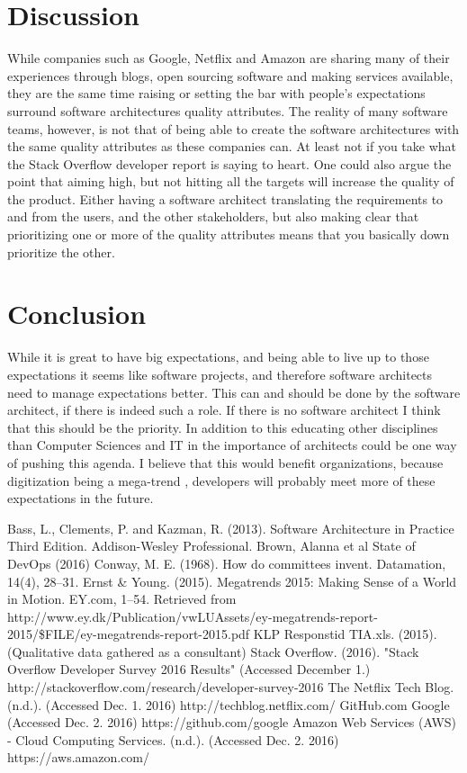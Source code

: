 \documentclass[a4paper, 10pt, conference]{ieeeconf}      %
\begin{document}
\section{Discussion}
While companies such as Google, Netflix and Amazon are sharing many of their experiences through blogs\cite{netflix}, open sourcing software\cite{github-google} and making services available\cite{amazon}, they are the same time raising or setting the bar with people’s expectations surround software architectures quality attributes.
The reality of many software teams, however, is not that of being able to create the software architectures with the same quality attributes as these companies can. At least not if you take what the Stack Overflow developer report \cite{c6} is saying to heart.
One could also argue the point that aiming high, but not hitting all the targets will increase the quality of the product.
Either having a software architect translating the requirements to and from the users, and the other stakeholders, but also making clear that prioritizing one or more of the quality attributes \cite{c1} means that you basically down prioritize the other. 

\section{Conclusion}
While it is great to have big expectations, and being able to live up to those expectations it seems like software projects, and therefore software architects need to manage expectations better. This can and should be done by the software architect, if there is indeed such a role. If there is no software architect I think that this should be the priority. 
In addition to this educating other disciplines than Computer Sciences and IT in the importance of architects could be one way of pushing this agenda.
I believe that this would benefit organizations, because digitization being a mega-trend \cite{c4}, developers will probably meet more of these expectations in the future.
\begin{thebibliography}{99}

 Bass, L., Clements, P. and Kazman, R. (2013). Software Architecture in Practice Third Edition. Addison-Wesley Professional.
Brown, Alanna et al State of DevOps (2016)
Conway, M. E. (1968). How do committees invent. Datamation, 14(4), 28–31.
Ernst \& Young. (2015). Megatrends 2015: Making Sense of a World in Motion. EY.com, 1–54. Retrieved from http://www.ey.dk/Publication/vwLUAssets/ey-megatrends-report-2015/\$FILE/ey-megatrends-report-2015.pdf
KLP Responstid TIA.xls. (2015). (Qualitative data gathered as a consultant)
Stack Overflow. (2016). "Stack Overflow Developer Survey 2016 Results" (Accessed December 1.) http://stackoverflow.com/research/developer-survey-2016
 The Netflix Tech Blog. (n.d.). (Accessed Dec. 1. 2016) http://techblog.netflix.com/
 GitHub.com Google (Accessed Dec. 2. 2016) https://github.com/google
 Amazon Web Services (AWS) - Cloud Computing Services. (n.d.). (Accessed Dec. 2. 2016) https://aws.amazon.com/

\end{thebibliography}
\end{document}
